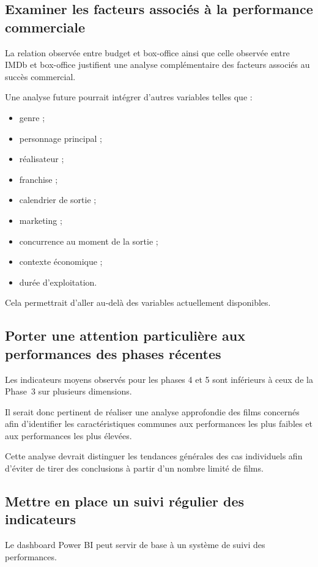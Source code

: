 \documentclass[a4paper,11pt]{article}
\begin{document}
\subsection{Examiner les facteurs associés à la performance commerciale}

La relation observée entre budget et box-office ainsi que celle observée
entre IMDb et box-office justifient une analyse complémentaire des facteurs
associés au succès commercial.

Une analyse future pourrait intégrer d'autres variables telles que :
\begin{itemize}
  \item genre ;
  \item personnage principal ;
  \item réalisateur ;
  \item franchise ;
  \item calendrier de sortie ;
  \item marketing ;
  \item concurrence au moment de la sortie ;
  \item contexte économique ;
  \item durée d'exploitation.
\end{itemize}

Cela permettrait d'aller au-delà des variables actuellement disponibles.

\subsection{Porter une attention particulière aux performances des phases
récentes}

Les indicateurs moyens observés pour les phases 4 et 5 sont inférieurs à ceux
de la Phase~3 sur plusieurs dimensions.

Il serait donc pertinent de réaliser une analyse approfondie des films
concernés afin d'identifier les caractéristiques communes aux performances
les plus faibles et aux performances les plus élevées.

Cette analyse devrait distinguer les tendances générales des cas individuels
afin d'éviter de tirer des conclusions à partir d'un nombre limité de films.

\subsection{Mettre en place un suivi régulier des indicateurs}

Le dashboard Power BI peut servir de base à un système de suivi des
performances.
\end{document}
